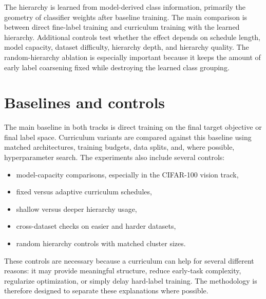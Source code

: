 \documentclass[english,master,a4paper,oneside]{ppfcmthesis}
\begin{document}
The hierarchy is learned from model-derived class information, primarily the
geometry of classifier weights after baseline training. The main comparison is
between direct fine-label training and curriculum training with the learned
hierarchy. Additional controls test whether the effect depends on schedule
length, model capacity, dataset difficulty, hierarchy depth, and hierarchy
quality. The random-hierarchy ablation is especially important because it keeps
the amount of early label coarsening fixed while destroying the learned class
grouping.

\section{Baselines and controls}

The main baseline in both tracks is direct training on the final target objective
or final label space. Curriculum variants are compared against this baseline
using matched architectures, training budgets, data splits, and, where possible,
hyperparameter search. The experiments also include several controls:

\begin{itemize}
    \item model-capacity comparisons, especially in the CIFAR-100 vision track,
    \item fixed versus adaptive curriculum schedules,
    \item shallow versus deeper hierarchy usage,
    \item cross-dataset checks on easier and harder datasets,
    \item random hierarchy controls with matched cluster sizes.
\end{itemize}

These controls are necessary because a curriculum can help for several different
reasons: it may provide meaningful structure, reduce early-task complexity,
regularize optimization, or simply delay hard-label training. The methodology is
therefore designed to separate these explanations where possible.
\end{document}
